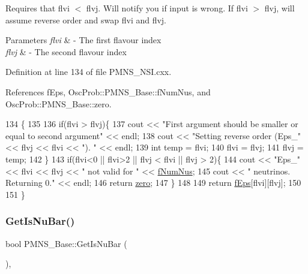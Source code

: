 Requires that flvi $<$ flvj. Will notify you if input is wrong. If flvi $>$ flvj, will assume reverse order and swap flvi and flvj.


\begin{DoxyParams}{Parameters}
{\em flvi} & -\/ The first flavour index \\
\hline
{\em flvj} & -\/ The second flavour index \\
\hline
\end{DoxyParams}


Definition at line 134 of file P\+M\+N\+S\+\_\+\+N\+S\+I.\+cxx.



References f\+Eps, Osc\+Prob\+::\+P\+M\+N\+S\+\_\+\+Base\+::f\+Num\+Nus, and Osc\+Prob\+::\+P\+M\+N\+S\+\_\+\+Base\+::zero.


\begin{DoxyCode}
134                                            \{
135 
136   \textcolor{keywordflow}{if}(flvi > flvj)\{
137     cout << \textcolor{stringliteral}{"First argument should be smaller or equal to second argument"} << endl;
138     cout << \textcolor{stringliteral}{"Setting reverse order (Eps\_"} << flvj << flvi << \textcolor{stringliteral}{"). "} << endl;
139     \textcolor{keywordtype}{int} temp = flvi;
140     flvi = flvj;
141     flvj = temp;
142   \}
143   \textcolor{keywordflow}{if}(flvi<0 || flvi>2 || flvj < flvi || flvj > 2)\{
144     cout << \textcolor{stringliteral}{"Eps\_"} << flvi << flvj << \textcolor{stringliteral}{" not valid for "} << \hyperlink{classOscProb_1_1PMNS__Base_a24bb74bed63569dfe88b18fa6a08060e}{fNumNus};
145     cout << \textcolor{stringliteral}{" neutrinos. Returning 0."} << endl;
146     \textcolor{keywordflow}{return} \hyperlink{classOscProb_1_1PMNS__Base_a05e595848c2521dc795efa7645728b94}{zero};
147   \}
148 
149   \textcolor{keywordflow}{return} \hyperlink{classOscProb_1_1PMNS__NSI_ab9328cb72e868b395f3efdd75b6af5e4}{fEps}[flvi][flvj];
150 
151 \}
\end{DoxyCode}
\mbox{\label{classOscProb_1_1PMNS__Base_a2f7f2a028dfe7a90fff6b4f757972c2c}} 
\subsubsection{\texorpdfstring{Get\+Is\+Nu\+Bar()}{GetIsNuBar()}}
{\footnotesize\ttfamily bool P\+M\+N\+S\+\_\+\+Base\+::\+Get\+Is\+Nu\+Bar (\begin{DoxyParamCaption}{ }\end{DoxyParamCaption})\hspace{0.3cm}{\ttfamily [virtual]}, {\ttfamily [inherited]}}

